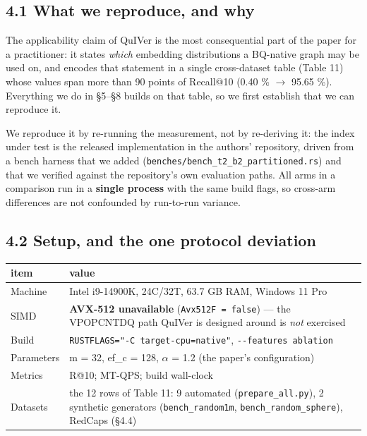 \documentclass[
  10pt,
]{article}
\newcounter{none} %
\begin{document}
\subsection{4.1 What we reproduce, and
why}\label{what-we-reproduce-and-why}

The applicability claim of QuIVer is the most consequential part of the
paper for a practitioner: it states \emph{which} embedding distributions
a BQ-native graph may be used on, and encodes that statement in a single
cross-dataset table (Table 11) whose values span more than 90 points of
Recall@10 (0.40 \% $\rightarrow$ 95.65 \%). Everything we do in §5--§8 builds on
that table, so we first establish that we can reproduce it.

We reproduce it by re-running the measurement, not by re-deriving it:
the index under test is the released implementation in the authors'
repository, driven from a bench harness that we added
(\texttt{benches/bench\_t2\_b2\_partitioned.rs}) and that we verified
against the repository's own evaluation paths. All arms in a comparison
run in a \textbf{single process} with the same build flags, so cross-arm
differences are not confounded by run-to-run variance.

\subsection{4.2 Setup, and the one protocol
deviation}\label{setup-and-the-one-protocol-deviation}

{\def\LTcaptype{none} %
\begin{longtable}[]{@{}
  >{\raggedright\arraybackslash}p{}
  >{\raggedright\arraybackslash}p{}@{}}
\toprule\noalign{}
\begin{minipage}[b]{\linewidth}\raggedright
item
\end{minipage} & \begin{minipage}[b]{\linewidth}\raggedright
value
\end{minipage} \\
\midrule\noalign{}
\endhead
\bottomrule\noalign{}
\endlastfoot
Machine & Intel i9-14900K, 24C/32T, 63.7 GB RAM, Windows 11 Pro \\
SIMD & \textbf{AVX-512 unavailable} (\texttt{Avx512F\ =\ false}) --- the
VPOPCNTDQ path QuIVer is designed around is \emph{not} exercised \\
Build & \texttt{RUSTFLAGS="-C\ target-cpu=native"},
\texttt{-\/-features\ ablation} \\
Parameters & m = 32, ef\_c = 128, $\alpha$ = 1.2 (the paper's configuration) \\
Metrics & R@10; MT-QPS; build wall-clock \\
Datasets & the 12 rows of Table 11: 9 automated
(\texttt{prepare\_all.py}), 2 synthetic generators
(\texttt{bench\_random1m}, \texttt{bench\_random\_sphere}), RedCaps
(§4.4) \\
\end{longtable}
}
\end{document}
